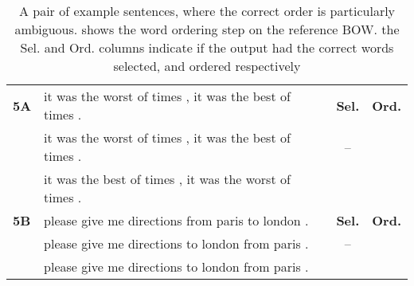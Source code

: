 \documentclass[class=article]{standalone}
\newcommand{\cmark}{\ding{51}}%
\newcommand{\xmark}{\ding{55}}%
\newcommand{\passmark}{--}
\begin{document}
	
	\begin{table*}
		\small
		\begin{tabular}{ p{\collenone} p{\collentwo} C{\collenthree} C{\collenthree} }
			
			\textbf{5A \hfill {}}  & it was the worst of times , it was the best of times . & \textbf{Sel.} & \textbf{Ord.} \\
			\textbf{\oracletitle}  & it was the worst of times , it was the best of times . & \passmark & \cmark \\
			\textbf{\twosteptitle}  & it was the best of times , it was the worst of times . & \cmark & \xmark \\
			\hline
			\textbf{5B \hfill {}}  & please give me directions from paris to london . & \textbf{Sel.} & \textbf{Ord.} \\
			\textbf{\oracletitle}  & please give me directions to london from paris . & \passmark & \xmark \\
			\textbf{\twosteptitle}  & please give me directions to london from paris . & \cmark & \xmark \\
			\hline
		\end{tabular}
		\caption{    \label{egordered} A pair of example sentences, where the correct order is particularly ambiguous. \oracletitle{}  shows the word ordering step on the reference BOW. the Sel. and Ord. columns indicate if the output had the correct words selected, and ordered respectively}
	\end{table*}
	
	
	
	
	
	
\end{document}
